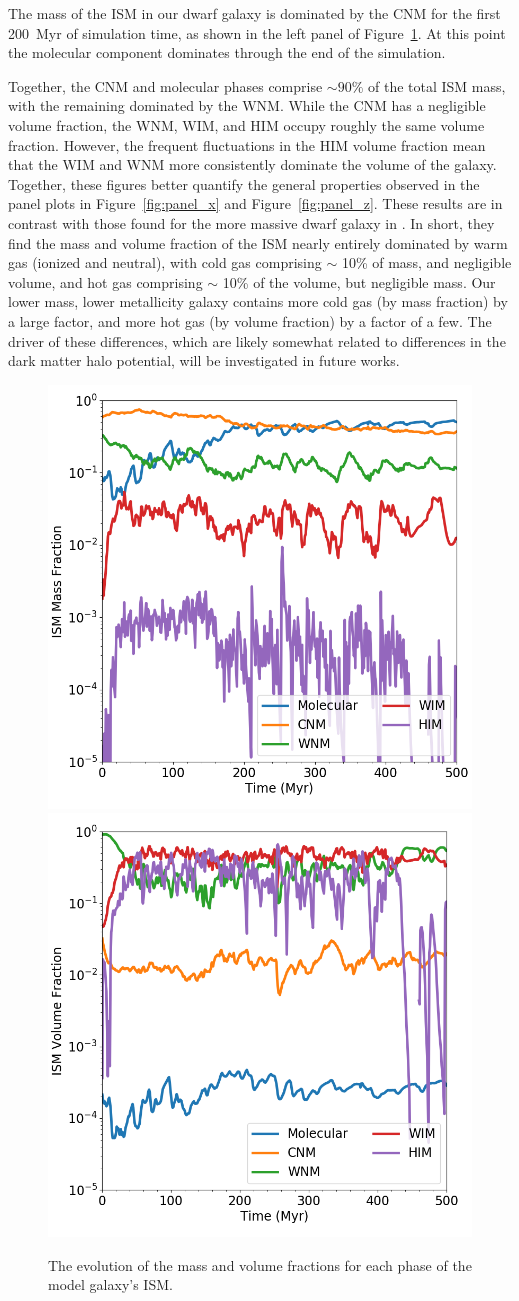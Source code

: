 \documentclass[twocolumn]{aastex61}
\begin{document}
The mass of the ISM in our dwarf galaxy is dominated by the CNM for the first 200~Myr of simulation time, as shown in the left panel of Figure~\ref{fig:ISM_evolution}. At this point the molecular component dominates through the end of the simulation.

Together, the CNM and molecular phases comprise $\sim 90\%$ of the total ISM mass, with the remaining dominated by the WNM. While the CNM has a negligible volume fraction, the WNM, WIM, and HIM occupy roughly the same volume fraction. However, the frequent fluctuations in the HIM volume fraction mean that the WIM and WNM more consistently dominate the volume of the galaxy. Together, these figures better quantify the general properties observed in the panel plots in Figure~\ref{fig:panel_x} and Figure~\ref{fig:panel_z}. These results are in contrast with those found for the more massive dwarf galaxy in \citet{Hu2016,Hu2017}. In short, they find the mass and volume fraction of the ISM nearly entirely dominated by warm gas (ionized and neutral), with cold gas comprising $\sim$ 10\% of mass, and negligible volume, and hot gas comprising $\sim$ 10\% of the volume, but negligible mass. Our lower mass, lower metallicity galaxy contains more cold gas (by mass fraction) by a large factor, and more hot gas (by volume fraction) by a factor of a few. The driver of these differences, which are likely somewhat related to differences in the dark matter halo potential, will be investigated in future works.

\begin{figure}
\centering
\includegraphics[width=0.45\linewidth]{phase_mass_fraction_evolution_log.png}
\includegraphics[width=0.45\linewidth]{phase_volume_fraction_evolution_log.png}
\caption{The evolution of the mass and volume fractions for each phase of the model galaxy's ISM.}
\label{fig:ISM_evolution}
\end{figure}
\end{document}
